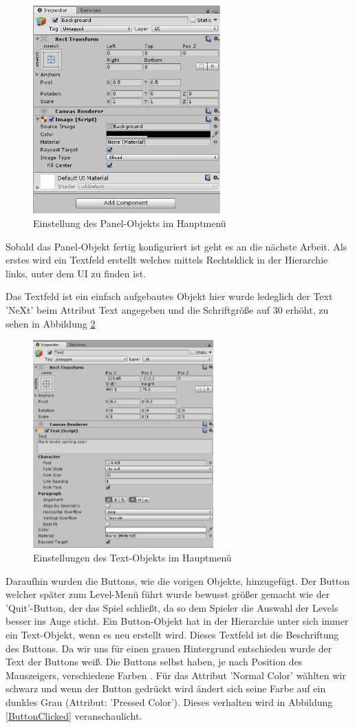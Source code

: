 \begin{figure}[H]
	\centering
	\includegraphics[height=8cm]{images/PanelSetup.png}
	\caption{Einstellung des Panel-Objekts im Hauptmenü}
	\label{PanelSetup}
\end{figure}

Sobald das Panel-Objekt fertig konfiguriert ist geht es an die nächste Arbeit. Als erstes wird ein Textfeld erstellt welches mittels Rechtsklick in der Hierarchie links, unter dem UI zu finden ist.

Das Textfeld ist ein einfach aufgebautes Objekt hier wurde ledeglich der Text 'NeXt' beim Attribut Text angegeben und die Schriftgröße auf 30 erhöht, zu sehen in Abbildung \ref{TextSetupMainMenu}
\begin{figure}[H]
	\centering
	\includegraphics[height=8cm]{images/MainMenuTextSetup.png}
	\caption{Einstellungen des Text-Objekts im Hauptmenü}
	\label{TextSetupMainMenu}
\end{figure}
 Daraufhin wurden die Buttons, wie die vorigen Objekte, hinzugefügt. Der Button welcher später zum Level-Menü führt wurde bewusst größer gemacht wie der 'Quit'-Button, der das Spiel schließt, da so dem Spieler die Auswahl der Levels besser ins Auge sticht. Ein Button-Objekt hat in der Hierarchie unter sich immer ein Text-Objekt, wenn es neu erstellt wird. Dieses Textfeld ist die Beschriftung des Buttons. Da wir uns für einen grauen Hintergrund entschieden wurde der Text der Buttons weiß. Die Buttons selbst haben, je nach Position des Mauszeigers, verschiedene Farben . Für das Attribut 'Normal Color' wählten wir schwarz und wenn der Button gedrückt wird ändert sich seine Farbe auf ein dunkles Grau (Attribut: 'Pressed Color'). Dieses verhalten wird in Abbildung \ref{ButtonClicked} veranschaulicht.
 
